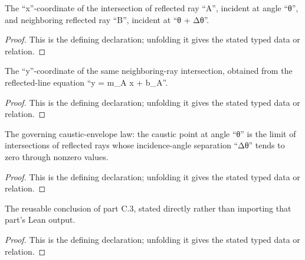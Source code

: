 \begin{definition}[neighboringIntersectionX]
  \label{decl:physics:IPhO_2026_2_C_4:neighboringIntersectionX}
  The “x”-coordinate of the intersection of reflected ray “A”, incident at angle “θ”, and neighboring reflected ray “B”, incident at “θ + Δθ”.
\end{definition}
\begin{proof}
  This is the defining declaration; unfolding it gives the stated typed data or relation.
\end{proof}

\begin{definition}[neighboringIntersectionY]
  \label{decl:physics:IPhO_2026_2_C_4:neighboringIntersectionY}
  The “y”-coordinate of the same neighboring-ray intersection, obtained from the reflected-line equation “y = m\_A x + b\_A”.
\end{definition}
\begin{proof}
  This is the defining declaration; unfolding it gives the stated typed data or relation.
\end{proof}

\begin{definition}[NeighboringReflectedRaysGenerateCaustic]
  \label{decl:physics:IPhO_2026_2_C_4:NeighboringReflectedRaysGenerateCaustic}
  The governing caustic-envelope law: the caustic point at angle “θ” is the limit of intersections of reflected rays whose incidence-angle separation “Δθ” tends to zero through nonzero values.
\end{definition}
\begin{proof}
  This is the defining declaration; unfolding it gives the stated typed data or relation.
\end{proof}

\begin{definition}
  \label{decl:physics:IPhO_2026_2_C_4:HasPreviousPartC3Coordinates}
  The reusable conclusion of part C.3, stated directly rather than importing that part's Lean output.
\end{definition}
\begin{proof}
  This is the defining declaration; unfolding it gives the stated typed data or relation.
\end{proof}

